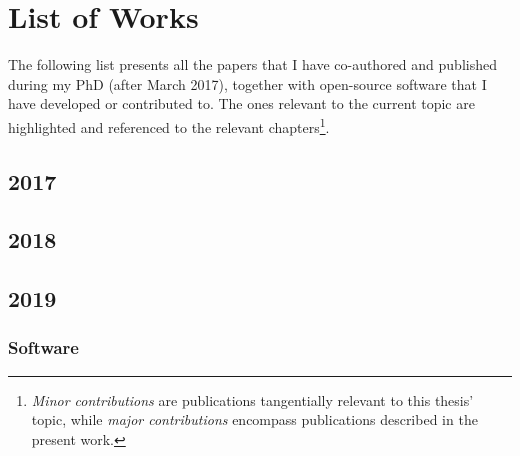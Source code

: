 \chapter{List of Works}%
\label{ch:all-works}

The following list presents all the papers that I have co-authored and published
during my PhD (after March 2017),
together with open-source software that I have developed or contributed to.
The ones relevant to the current topic are highlighted and referenced to
the relevant chapters\footnote{\emph{Minor contributions} are publications
tangentially relevant to this thesis' topic, while \emph{major contributions}
encompass publications described in the present work.}.

\section*{2017}

\section*{2018}

\section*{2019}

\subsection*{Software}

